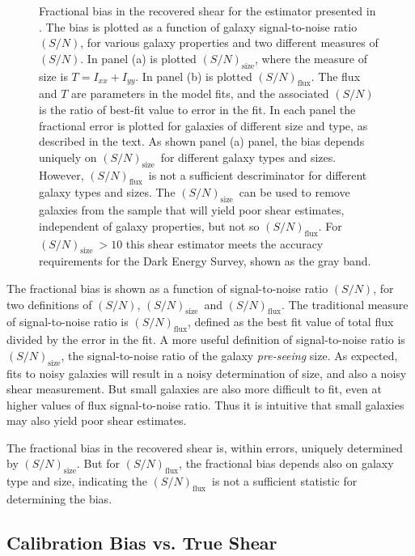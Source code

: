 \documentclass[12pt,preprint]{aastex}
\newcommand{\Tsn}{$(S/N)_{\textrm{size}}$}
\newcommand{\fsn}{$(S/N)_{\textrm{flux}}$}
\begin{document}
\begin{figure}[p]
 \caption{ Fractional bias in the recovered shear for the estimator presented
     in \cite{ba13}.  The bias is plotted as a
     function of galaxy signal-to-noise ratio $(S/N)$, for various galaxy
     properties and two different measures of $(S/N)$.  In panel (a) is
     plotted \Tsn, where the measure of size is $T=I_{xx} + I_{yy}$.  In 
     panel (b) is plotted \fsn.  The flux and $T$ are parameters in the model
     fits, and the associated $(S/N)$ is the ratio of best-fit value to error in
     the fit.  In each panel the fractional error is plotted for galaxies of
     different size and type, as described in the text.  As shown panel (a)
     panel, the bias depends uniquely on \Tsn\ for different galaxy types and
     sizes.  However, \fsn\ is not a sufficient descriminator for different
     galaxy types and sizes.  The \Tsn\ can be used to remove galaxies from the
     sample that will yield poor shear estimates, independent of galaxy
     properties, but not so \fsn.  For \Tsn$~ > 10$ this shear estimator meets
 the accuracy requirements for the Dark Energy Survey, shown as the gray band.
 \label{fig:fracerr}}

\end{figure}

The fractional bias is shown as a function of signal-to-noise ratio $(S/N)$,
for two definitions of $(S/N)$, \Tsn\ and \fsn.  The traditional measure of
signal-to-noise ratio is \fsn, defined as the best fit value of total
flux divided by the error in the fit.  A more useful definition of
signal-to-noise ratio is \Tsn, the signal-to-noise ratio of the galaxy {\it
pre-seeing} size.  As expected, fits to noisy galaxies will result in a noisy
determination of size, and also a noisy shear measurement. But small galaxies
are also more difficult to fit, even at higher values of flux signal-to-noise
ratio.  Thus it is intuitive that small galaxies may also yield poor shear
estimates.

The fractional bias in the recovered shear is, within errors, uniquely
determined by \Tsn.  But for \fsn, the fractional bias depends also on galaxy
type and size, indicating the \fsn\ is not a sufficient statistic for
determining the bias.

\subsection{Calibration Bias vs. True Shear} \label{sec:truebias}
\end{document}
